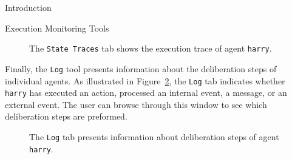 \begin{chapter}{Introduction}
\begin{section}{Execution Monitoring Tools}
\begin{figure}
    \begin{center}
        \caption{The {\tt State Traces} tab shows the execution trace of agent {\tt harry}.}\label{fig:statetracer}
    \end{center}
\end{figure}

Finally, the {\tt Log} tool presents information about the
deliberation steps of individual agents. As illustrated in
Figure~\ref{fig:log}, the {\tt Log} tab indicates whether {\tt
harry} has executed an action, processed an internal event, a
message, or an external event. The user can browse through this
window to see which deliberation steps are preformed.

\begin{figure}
    \begin{center}
        \caption{The {\tt Log} tab presents information about deliberation steps of agent {\tt harry}.}\label{fig:log}
    \end{center}
\end{figure}

\end{section}
\end{chapter}
